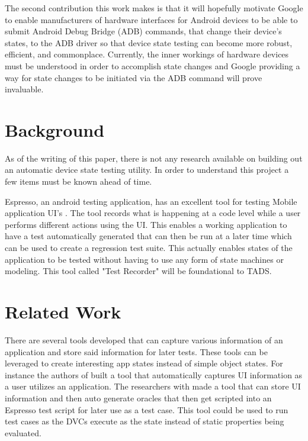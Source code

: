 The second contribution this work makes is that it will hopefully motivate Google to enable manufacturers of hardware interfaces for Android devices  to be able to submit Android Debug Bridge (ADB) commands, that change their device's states, to the ADB driver so that device state testing can become more robust, efficient, and commonplace. Currently, the inner workings of hardware devices must be understood in order to accomplish state changes and Google providing a way for state changes to be initiated via the ADB command will prove invaluable.   


\section{Background}
As of the writing of this paper, there is not any research available on building out an automatic device state testing utility.  In order to understand this project a few items must be known ahead of time.  

Espresso, an android testing application, has an excellent tool for testing Mobile application UI's \cite{nolan2015agile}.  The tool records what is happening at a code level while a user performs different actions using the UI.  This enables a working application to have a test automatically generated that can then be run at a later time which can be used to create a regression test suite.  This actually enables states of the application to be tested without having to use any form of state machines or modeling.  This tool called "Test Recorder" will be foundational to TADS. 


\section{Related Work}
There are several tools developed that can capture various information of an application and store said information for later tests.  These tools can be leveraged to create interesting app states instead of simple object states.  For instance the authors of \cite{7962332} built a tool that automatically captures UI information as a user utilizes an application.  The researchers with\cite{7927971} made a tool that can store UI information and then auto generate oracles that then get scripted into an Espresso test script for later use as a test case.  This tool could be used to run test cases as the DVCs execute as the state instead of static properties being evaluated. 

